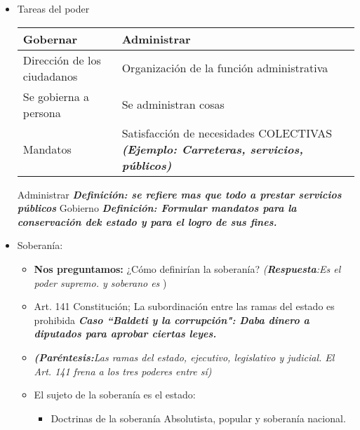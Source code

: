 \begin{itemize}
    
    \item Tareas del poder
    \begin{center}
    \begin{tabular}{ | p{6cm} | p{8cm} | } 
     \hline
    Gobernar & Administrar \\
    \hline
    Dirección de los ciudadanos & Organización de la función administrativa \\
    \hline
    Se gobierna a persona & Se administran cosas \\ 
    \hline
    Mandatos & Satisfacción de necesidades COLECTIVAS \textbf{\emph{(Ejemplo: Carreteras, servicios, públicos)}} \\
     \hline
    \end{tabular}
    \end{center}

    Administrar \textbf{\emph{Definición: se refiere mas que todo a prestar servicios públicos}} \newline 
    Gobierno \textbf{\emph{Definición: Formular mandatos para la conservación dek estado y para el logro de sus fines.}}

    
    \item Soberanía:
    \begin{itemize}
        \item \textbf{Nos preguntamos:} ¿Cómo definirían la soberanía? \emph{(\textbf{Respuesta}:Es el poder supremo. y soberano es })
        \item Art. 141 Constitución; La subordinación entre las ramas del estado es prohibida \textbf{\emph{Caso ``Baldeti y la corrupción": Daba dinero a diputados para aprobar ciertas leyes.}}
        \item \emph{\textbf{(Paréntesis:}Las ramas del estado, ejecutivo, legislativo y judicial. El Art. 141 frena a los tres poderes entre sí)}
        \item El sujeto de la soberanía es el estado: 
        \begin{itemize}
            \item Doctrinas de la soberanía Absolutista, popular y soberanía nacional.
        \end{itemize}
    \end{itemize}


\end{itemize}
